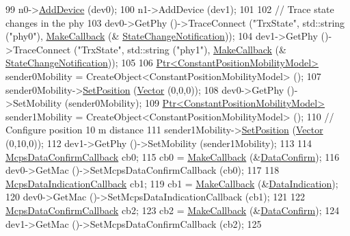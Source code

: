 \begin{DoxyCode}
99   n0->\hyperlink{classns3_1_1Node_a42ff83ee1d5d1649c770d3f5b62375de}{AddDevice} (dev0);
100   n1->AddDevice (dev1);
101 
102   \textcolor{comment}{// Trace state changes in the phy}
103   dev0->GetPhy ()->TraceConnect (\textcolor{stringliteral}{"TrxState"}, std::string (\textcolor{stringliteral}{"phy0"}), \hyperlink{group__makecallbackmemptr_ga9376283685aa99d204048d6a4b7610a4}{MakeCallback} (&
      \hyperlink{lr-wpan-data_8cc_aed2e31e36ab5372d8c92e97e5e4215ae}{StateChangeNotification}));
104   dev1->GetPhy ()->TraceConnect (\textcolor{stringliteral}{"TrxState"}, std::string (\textcolor{stringliteral}{"phy1"}), \hyperlink{group__makecallbackmemptr_ga9376283685aa99d204048d6a4b7610a4}{MakeCallback} (&
      \hyperlink{lr-wpan-data_8cc_aed2e31e36ab5372d8c92e97e5e4215ae}{StateChangeNotification}));
105 
106   \hyperlink{classns3_1_1Ptr}{Ptr<ConstantPositionMobilityModel>} sender0Mobility = 
      CreateObject<ConstantPositionMobilityModel> ();
107   sender0Mobility->\hyperlink{classns3_1_1MobilityModel_ac584b3d5a309709d2f13ed6ada1e7640}{SetPosition} (\hyperlink{classns3_1_1Vector3D_a7e59b47bc94c9cb1dadff68c1d0112d8}{Vector} (0,0,0));
108   dev0->GetPhy ()->SetMobility (sender0Mobility);
109   \hyperlink{classns3_1_1Ptr}{Ptr<ConstantPositionMobilityModel>} sender1Mobility = 
      CreateObject<ConstantPositionMobilityModel> ();
110   \textcolor{comment}{// Configure position 10 m distance}
111   sender1Mobility->\hyperlink{classns3_1_1MobilityModel_ac584b3d5a309709d2f13ed6ada1e7640}{SetPosition} (\hyperlink{classns3_1_1Vector3D_a7e59b47bc94c9cb1dadff68c1d0112d8}{Vector} (0,10,0));
112   dev1->GetPhy ()->SetMobility (sender1Mobility);
113 
114   \hyperlink{classns3_1_1Callback}{McpsDataConfirmCallback} cb0;
115   cb0 = \hyperlink{group__makecallbackmemptr_ga9376283685aa99d204048d6a4b7610a4}{MakeCallback} (&\hyperlink{lr-wpan-data_8cc_a2007bf71d36faa06c946470857adc7f0}{DataConfirm});
116   dev0->GetMac ()->SetMcpsDataConfirmCallback (cb0);
117 
118   \hyperlink{classns3_1_1Callback}{McpsDataIndicationCallback} cb1;
119   cb1 = \hyperlink{group__makecallbackmemptr_ga9376283685aa99d204048d6a4b7610a4}{MakeCallback} (&\hyperlink{lr-wpan-data_8cc_a910681814411efb730f34de800607624}{DataIndication});
120   dev0->GetMac ()->SetMcpsDataIndicationCallback (cb1);
121 
122   \hyperlink{classns3_1_1Callback}{McpsDataConfirmCallback} cb2;
123   cb2 = \hyperlink{group__makecallbackmemptr_ga9376283685aa99d204048d6a4b7610a4}{MakeCallback} (&\hyperlink{lr-wpan-data_8cc_a2007bf71d36faa06c946470857adc7f0}{DataConfirm});
124   dev1->GetMac ()->SetMcpsDataConfirmCallback (cb2);
125 

\end{DoxyCode}
